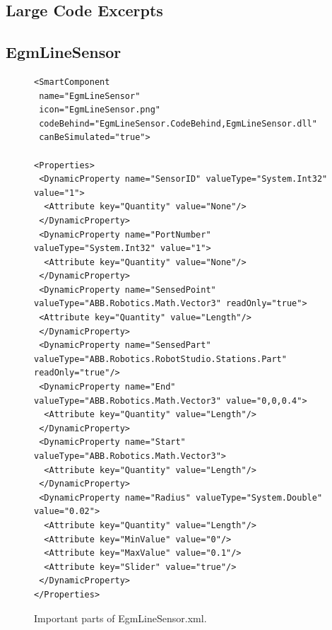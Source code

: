 \documentclass{cslthse-msc}
\begin{document}
\begin{appendices}

\chapter{Large Code Excerpts}

\section{EgmLineSensor}
\label{app:Code:EgmLineSensor}
\label{app:Code}
\lstset{language=XML}
\begin{figure}[H]
    \centering
    \begin{lstlisting}[fontadjust]
<SmartComponent 
 name="EgmLineSensor" 
 icon="EgmLineSensor.png"
 codeBehind="EgmLineSensor.CodeBehind,EgmLineSensor.dll"
 canBeSimulated="true">
	
<Properties>
 <DynamicProperty name="SensorID" valueType="System.Int32" value="1">
  <Attribute key="Quantity" value="None"/>
 </DynamicProperty>
 <DynamicProperty name="PortNumber" valueType="System.Int32" value="1">
  <Attribute key="Quantity" value="None"/>
 </DynamicProperty>
 <DynamicProperty name="SensedPoint" valueType="ABB.Robotics.Math.Vector3" readOnly="true">
 <Attribute key="Quantity" value="Length"/>
 </DynamicProperty>
 <DynamicProperty name="SensedPart" valueType="ABB.Robotics.RobotStudio.Stations.Part" readOnly="true"/>
 <DynamicProperty name="End" valueType="ABB.Robotics.Math.Vector3" value="0,0,0.4">
  <Attribute key="Quantity" value="Length"/>
 </DynamicProperty>
 <DynamicProperty name="Start" valueType="ABB.Robotics.Math.Vector3">
  <Attribute key="Quantity" value="Length"/>
 </DynamicProperty>
 <DynamicProperty name="Radius" valueType="System.Double" value="0.02">
  <Attribute key="Quantity" value="Length"/>
  <Attribute key="MinValue" value="0"/>
  <Attribute key="MaxValue" value="0.1"/>
  <Attribute key="Slider" value="true"/>
 </DynamicProperty>
</Properties>
    \end{lstlisting}
    \caption{Important parts of EgmLineSensor.xml.}
    \label{fig:EgmLineSensorXml}
\end{figure}


\end{appendices}
\end{document}

